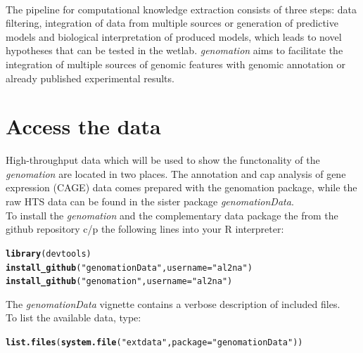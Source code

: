 \documentclass{article}\usepackage[]{graphicx}\usepackage[]{color}
\makeatletter
\newcommand{\hlstr}[1]{\textcolor[rgb]{0.192,0.494,0.8}{#1}}%
\newcommand{\hlstd}[1]{\textcolor[rgb]{0.345,0.345,0.345}{#1}}%
\newcommand{\hlkwc}[1]{\textcolor[rgb]{0.333,0.667,0.333}{#1}}%
\newcommand{\hlkwd}[1]{\textcolor[rgb]{0.737,0.353,0.396}{\textbf{#1}}}%
\newenvironment{kframe}{%
 \def\at@end@of@kframe{}%
 \ifinner\ifhmode%
  \def\at@end@of@kframe{\end{minipage}}%
  \begin{minipage}{\columnwidth}%
 \fi\fi%
 \def\FrameCommand##1{\hskip\@totalleftmargin \hskip-\fboxsep
 \colorbox{shadecolor}{##1}\hskip-\fboxsep
     \hskip-\linewidth \hskip-\@totalleftmargin \hskip\columnwidth}%
 \MakeFramed {\advance\hsize-\width
   \@totalleftmargin\z@ \linewidth\hsize
   \@setminipage}}%
 {\par\unskip\endMakeFramed%
 \at@end@of@kframe}
\newenvironment{knitrout}{}{} %
\newcommand{\Rpackage}[1]{{\textit{#1}}}
\makeatother
\begin{document}
\\
The pipeline for computational knowledge extraction consists of three steps: data filtering, integration of data from multiple sources or generation of predictive models and biological interpretation of produced models, which leads to novel hypotheses that can be tested in the wetlab. \Rpackage{genomation} aims to facilitate the integration of multiple sources of genomic features with genomic annotation or already published experimental results.
\newpage

\section{Access the data}

High-throughput data which will be used to show the functonality of the \Rpackage{genomation} are located in two places. The annotation and cap analysis of gene expression (CAGE) data comes prepared with the genomation package, while the raw HTS data can be found in the sister package \Rpackage{genomationData}.\\
To install the \Rpackage{genomation} and the complementary data package the from the github repository c/p the following lines into your R interpreter:
\begin{knitrout}
\color{fgcolor}\begin{kframe}
\begin{alltt}
\hlkwd{library}\hlstd{(devtools)}
\hlkwd{install_github}\hlstd{(}\hlstr{"genomationData"}\hlstd{,} \hlkwc{username} \hlstd{=} \hlstr{"al2na"}\hlstd{)}
\hlkwd{install_github}\hlstd{(}\hlstr{"genomation"}\hlstd{,} \hlkwc{username} \hlstd{=} \hlstr{"al2na"}\hlstd{)}
\end{alltt}
\end{kframe}
\end{knitrout}


The \Rpackage{genomationData} vignette contains a verbose description of included files.\\
To list the available data, type:
\begin{knitrout}
\color{fgcolor}\begin{kframe}
\begin{alltt}
\hlkwd{list.files}\hlstd{(}\hlkwd{system.file}\hlstd{(}\hlstr{"extdata"}\hlstd{,} \hlkwc{package} \hlstd{=} \hlstr{"genomationData"}\hlstd{))}
\end{alltt}
\end{kframe}
\end{knitrout}
\end{document}
